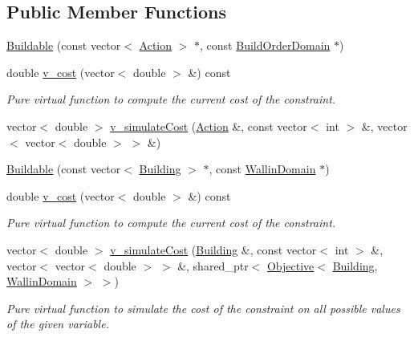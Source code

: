 \subsection*{Public Member Functions}
\begin{DoxyCompactItemize}
\item 
\hyperlink{classghost_1_1Buildable_a81873d4e7eb020f66d16c3024b3c52cd}{Buildable} (const vector$<$ \hyperlink{classghost_1_1Action}{Action} $>$ $\ast$, const \hyperlink{classghost_1_1BuildOrderDomain}{Build\-Order\-Domain} $\ast$)
\item 
double \hyperlink{classghost_1_1Buildable_a584162de15bdeb91c7f9a0d0a0fa3c87}{v\-\_\-cost} (vector$<$ double $>$ \&) const 
\begin{DoxyCompactList}\small\item\em Pure virtual function to compute the current cost of the constraint. \end{DoxyCompactList}\item 
vector$<$ double $>$ \hyperlink{classghost_1_1Buildable_a0d33808d13f87e9ff04589bb43d56fa8}{v\-\_\-simulate\-Cost} (\hyperlink{classghost_1_1Action}{Action} \&, const vector$<$ int $>$ \&, vector$<$ vector$<$ double $>$ $>$ \&)
\item 
\hyperlink{classghost_1_1Buildable_afb25530b221922dd29a0a5bd7cdd68c6}{Buildable} (const vector$<$ \hyperlink{classghost_1_1Building}{Building} $>$ $\ast$, const \hyperlink{classghost_1_1WallinDomain}{Wallin\-Domain} $\ast$)
\item 
double \hyperlink{classghost_1_1Buildable_a584162de15bdeb91c7f9a0d0a0fa3c87}{v\-\_\-cost} (vector$<$ double $>$ \&) const 
\begin{DoxyCompactList}\small\item\em Pure virtual function to compute the current cost of the constraint. \end{DoxyCompactList}\item 
vector$<$ double $>$ \hyperlink{classghost_1_1Buildable_a8b2f97c002509cd35846af837405fc1e}{v\-\_\-simulate\-Cost} (\hyperlink{classghost_1_1Building}{Building} \&, const vector$<$ int $>$ \&, vector$<$ vector$<$ double $>$ $>$ \&, shared\-\_\-ptr$<$ \hyperlink{classghost_1_1Objective}{Objective}$<$ \hyperlink{classghost_1_1Building}{Building}, \hyperlink{classghost_1_1WallinDomain}{Wallin\-Domain} $>$ $>$)
\begin{DoxyCompactList}\small\item\em Pure virtual function to simulate the cost of the constraint on all possible values of the given variable. \end{DoxyCompactList}\end{DoxyCompactItemize}
